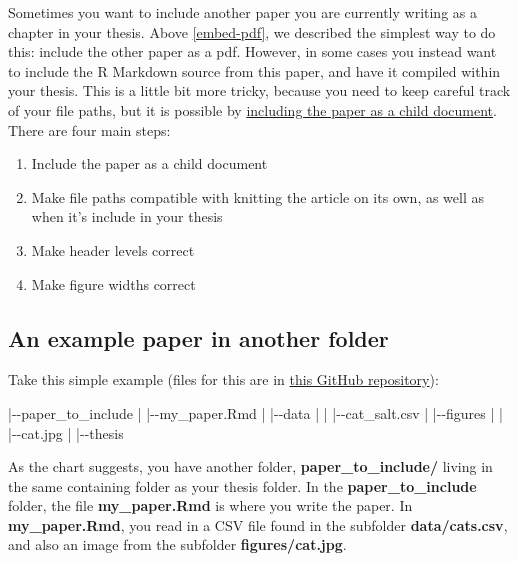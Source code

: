 \documentclass[a4paper, nobind]{templates/ociamthesis}
\providecommand{\tightlist}{%
  \setlength{\itemsep}{0pt}\setlength{\parskip}{0pt}}
\newenvironment{Shaded}{\begin{snugshade}}{\end{snugshade}}
\newcommand{\NormalTok}[1]{#1}
\renewenvironment{Shaded}
{
  \vspace{10pt}%
  \begin{snugshade}%
}{%
  \end{snugshade}%
  \vspace{8pt}%
}
\begin{document}
Sometimes you want to include another paper you are currently writing as a chapter in your thesis.
Above \ref{embed-pdf}, we described the simplest way to do this: include the other paper as a pdf.
However, in some cases you instead want to include the R Markdown source from this paper, and have it compiled within your thesis.
This is a little bit more tricky, because you need to keep careful track of your file paths, but it is possible by \href{https://bookdown.org/yihui/rmarkdown-cookbook/child-document.html}{including the paper as a child document}.
There are four main steps:

\begin{enumerate}
\def\labelenumi{\arabic{enumi}.}
\tightlist
\item
  Include the paper as a child document
\item
  Make file paths compatible with knitting the article on its own, as well as when it's include in your thesis
\item
  Make header levels correct
\item
  Make figure widths correct
\end{enumerate}

\hypertarget{an-example-paper-in-another-folder}{%
\subsection{An example paper in another folder}\label{an-example-paper-in-another-folder}}

Take this simple example (files for this are in \href{https://github.com/ulyngs/oxforddown-external-article}{this GitHub repository}):

\begin{Shaded}
\begin{Highlighting}[]
\NormalTok{|{-}{-}paper\_to\_include}
\NormalTok{|  |{-}{-}my\_paper.Rmd}
\NormalTok{|  |{-}{-}data}
\NormalTok{|  |  |{-}{-}cat\_salt.csv}
\NormalTok{|  |{-}{-}figures}
\NormalTok{|  |  |{-}{-}cat.jpg}
\NormalTok{|}
\NormalTok{|{-}{-}thesis}
\end{Highlighting}
\end{Shaded}

As the chart suggests, you have another folder, \textbf{paper\_to\_include/} living in the same containing folder as your thesis folder.
In the \textbf{paper\_to\_include} folder, the file \textbf{my\_paper.Rmd} is where you write the paper.
In \textbf{my\_paper.Rmd}, you read in a CSV file found in the subfolder \textbf{data/cats.csv}, and also an image from the subfolder \textbf{figures/cat.jpg}.
\end{document}
